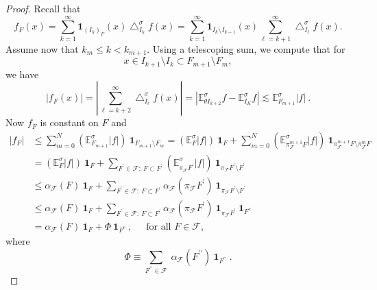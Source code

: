 \documentclass[10pt,a4paper]{amsart}
\begin{document}
\begin{proof}
Recall that%
\[
f_{F}\left(  x\right)  =\sum_{k=1}^{\infty}\mathbf{1}_{\left(  I_{k}\right)
_{F}}\left(  x\right)  \bigtriangleup_{I_{k}}^{\sigma}f\left(  x\right)
=\sum_{k=1}^{\infty}\mathbf{1}_{I_{k}\setminus I_{k-1}}\left(  x\right)
\sum_{\ell=k+1}^{\infty}\bigtriangleup_{I_{\ell}}^{\sigma}f\left(  x\right)  .
\]
Assume now that $k_{m}\leq k<k_{m+1}$. Using a telescoping sum, we compute
that for
\[
x\in I_{k+1}\setminus I_{k}\subset F_{m+1}\setminus F_{m},
\]
we have
\[
\left\vert f_{F}\left(  x\right)  \right\vert =\left\vert \sum_{\ell
=k+2}^{\infty}\bigtriangleup_{I_{\ell}}^{\sigma}f\left(  x\right)  \right\vert
=\left\vert \mathbb{E}_{\theta I_{k+2}}^{\sigma}f-\mathbb{E}_{I_{K}}^{\sigma
}f\right\vert \lesssim\mathbb{E}_{F_{m+1}}^{\sigma}\left\vert f\right\vert \ .
\]
Now $f_{F}$ is constant on $F$ and%
\begin{align*}
\left\vert f_{F}\right\vert  & \leq\sum_{m=0}^{N}\left(  \mathbb{E}_{F_{m+1}%
}^{\sigma}\left\vert f\right\vert \right)  \ \mathbf{1}_{F_{m+1}\setminus
F_{m}}=\left(  \mathbb{E}_{F}^{\sigma}\left\vert f\right\vert \right)
\ \mathbf{1}_{F}+\sum_{m=0}^{N}\left(  \mathbb{E}_{\pi_{\mathcal{F}}^{m+1}%
F}^{\sigma}\left\vert f\right\vert \right)  \ \mathbf{1}_{\pi_{\mathcal{F}%
}^{m+1}F\setminus\pi_{\mathcal{F}}^{m}F}\\
& =\left(  \mathbb{E}_{F}^{\sigma}\left\vert f\right\vert \right)
\ \mathbf{1}_{F}+\sum_{F^{\prime}\in\mathcal{F}:\ F\subset F^{\prime}}\left(
\mathbb{E}_{\pi_{\mathcal{F}}F^{\prime}}^{\sigma}\left\vert f\right\vert
\right)  \ \mathbf{1}_{\pi_{\mathcal{F}}F^{\prime}\setminus F^{\prime}}\\
& \leq\alpha_{\mathcal{F}}\left(  F\right)  \ \mathbf{1}_{F}+\sum_{F^{\prime
}\in\mathcal{F}:\ F\subset F^{\prime}}\alpha_{\mathcal{F}}\left(
\pi_{\mathcal{F}}F^{\prime}\right)  \ \mathbf{1}_{\pi_{\mathcal{F}}F^{\prime
}\setminus F^{\prime}}\\
& \leq\alpha_{\mathcal{F}}\left(  F\right)  \ \mathbf{1}_{F}+\sum_{F^{\prime
}\in\mathcal{F}:\ F\subset F^{\prime}}\alpha_{\mathcal{F}}\left(
\pi_{\mathcal{F}}F^{\prime}\right)  \ \mathbf{1}_{\pi_{\mathcal{F}}F^{\prime}%
}\ \mathbf{1}_{F^{c}}\\
& =\alpha_{\mathcal{F}}\left(  F\right)  \ \mathbf{1}_{F}+\Phi\ \mathbf{1}%
_{F^{c}}\ ,\ \ \ \ \ \text{\ for all }F\in\mathcal{F},
\end{align*}
where%
\[
\Phi\equiv\sum_{F^{\prime\prime}\in\mathcal{F}}\ \alpha_{\mathcal{F}}\left(
F^{\prime\prime}\right)  \ \mathbf{1}_{F^{\prime\prime}}\ .
\]



\end{proof}
\end{document}
